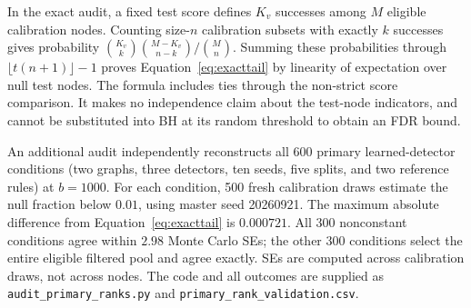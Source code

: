 \documentclass[twoside]{article}
\begin{document}
In the exact audit, a fixed test score defines $K_v$ successes among $M$ eligible calibration nodes. Counting size-$n$ calibration subsets with exactly $k$ successes gives probability $\binom{K_v}{k}\binom{M-K_v}{n-k}/\binom{M}{n}$. Summing these probabilities through $\lfloor t(n+1)\rfloor-1$ proves Equation~\eqref{eq:exacttail} by linearity of expectation over null test nodes. The formula includes ties through the non-strict score comparison. It makes no independence claim about the test-node indicators, and cannot be substituted into BH at its random threshold to obtain an FDR bound.

An additional audit independently reconstructs all 600 primary learned-detector conditions (two graphs, three detectors, ten seeds, five splits, and two reference rules) at $b=1000$. For each condition, 500 fresh calibration draws estimate the null fraction below $0.01$, using master seed 20260921. The maximum absolute difference from Equation~\eqref{eq:exacttail} is $0.000721$. All 300 nonconstant conditions agree within $2.98$ Monte Carlo SEs; the other 300 conditions select the entire eligible filtered pool and agree exactly. SEs are computed across calibration draws, not across nodes. The code and all outcomes are supplied as \texttt{audit\_primary\_ranks.py} and \texttt{primary\_rank\_validation.csv}.
\end{document}
